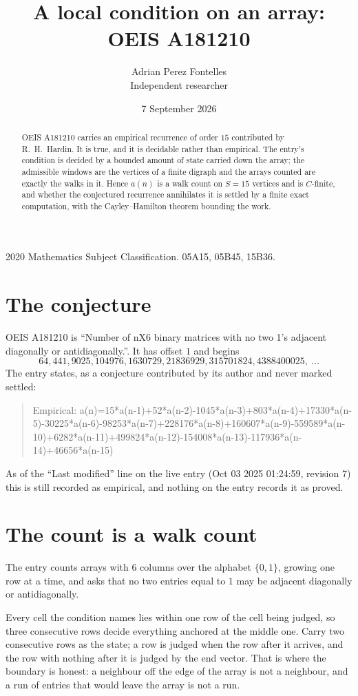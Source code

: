 \documentclass[11pt,a4paper]{article}
\title{A local condition on an array: OEIS A181210}
\author{Adrian Perez Fontelles\\ \small Independent researcher}
\date{7 September 2026}
\theoremstyle{plain}
\theoremstyle{definition}
\begin{document}
\maketitle

\begin{abstract}
OEIS A181210 carries an empirical recurrence of order $15$ contributed by R.~H.~Hardin. It is
true, and it is decidable rather than empirical. The entry's condition is decided by a bounded amount of state carried down the array; the
admissible windows are the vertices of a finite digraph and the arrays counted are exactly the
walks in it. Hence $a(n)$ is a walk count on $S=15$ vertices and is $C$-finite, and whether the
conjectured recurrence annihilates it is settled by a finite exact computation, with the
Cayley--Hamilton theorem bounding the work.
\end{abstract}

\noindent\small 2020 Mathematics Subject Classification. 05A15, 05B45, 15B36.\normalsize

\section{The conjecture}

OEIS A181210 is ``Number of nX6 binary matrices with no two 1's adjacent diagonally or antidiagonally.''. It has offset $1$ and begins
\[
64, 441, 9025, 104976, 1630729, 21836929, 315701824, 4388400025,\ \dots
\]
The entry states, as a conjecture contributed by its author and never marked settled:
\begin{quote}
Empirical: a(n)=15*a(n-1)+52*a(n-2)-1045*a(n-3)+803*a(n-4)+17330*a(n-5)-30225*a(n-6)-98253*a(n-7)+228176*a(n-8)+160607*a(n-9)-559589*a(n-10)+6282*a(n-11)+499824*a(n-12)-154008*a(n-13)-117936*a(n-14)+46656*a(n-15)
\end{quote}
As of the ``Last modified'' line on the live entry (Oct 03 2025 01:24:59, revision 7) this is still
recorded as empirical, and nothing on the entry records it as proved.

\section{The count is a walk count}

The entry counts arrays with $6$ columns over the alphabet $\{0,1\}$, growing one row at a time, and asks that no two entries equal to $1$ may be adjacent diagonally or antidiagonally.

Every cell the condition names lies within one row of the cell being judged, so three consecutive rows decide everything anchored at the middle one. Carry two consecutive rows as the state; a row is judged when the row after it arrives, and the row with nothing after it is judged by the end vector. That is where the boundary is honest: a neighbour off the edge of the array is not a neighbour, and a run of entries that would leave the array is not a run.
\end{document}
